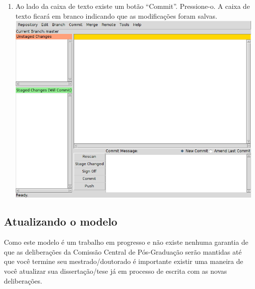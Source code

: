 \begin{enumerate}
  \item Ao lado da caixa de texto existe um botão ``Commit''. Pressione-o. A
    caixa de texto ficará em branco indicando que as modificações foram
    salvas.\\
    \includegraphics[scale=.6]{figuras/git-gui04-1}
\end{enumerate}

\subsection{Atualizando o modelo}
Como este modelo é um trabalho em progresso e não existe nenhuma garantia de que
as deliberações da Comissão Central de Pós-Graduação serão mantidas até que você
termine seu mestrado/doutorado é importante existir uma maneira de você
atualizar sua dissertação/tese já em processo de escrita com as novas
deliberações.

